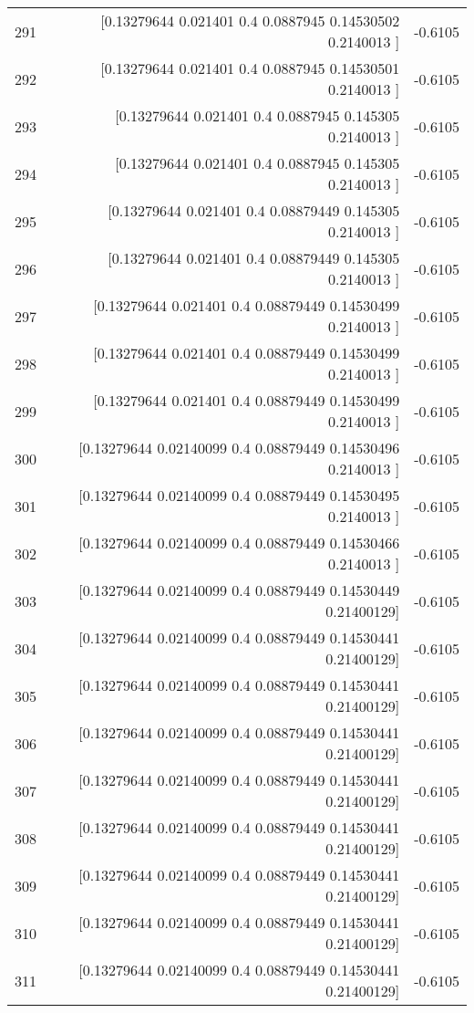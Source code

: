 \begin{longtable}{lrr}
291 & [0.13279644 0.021401   0.4        0.0887945  0.14530502 0.2140013 ] & -0.6105 \\
292 & [0.13279644 0.021401   0.4        0.0887945  0.14530501 0.2140013 ] & -0.6105 \\
293 & [0.13279644 0.021401   0.4        0.0887945  0.145305   0.2140013 ] & -0.6105 \\
294 & [0.13279644 0.021401   0.4        0.0887945  0.145305   0.2140013 ] & -0.6105 \\
295 & [0.13279644 0.021401   0.4        0.08879449 0.145305   0.2140013 ] & -0.6105 \\
296 & [0.13279644 0.021401   0.4        0.08879449 0.145305   0.2140013 ] & -0.6105 \\
297 & [0.13279644 0.021401   0.4        0.08879449 0.14530499 0.2140013 ] & -0.6105 \\
298 & [0.13279644 0.021401   0.4        0.08879449 0.14530499 0.2140013 ] & -0.6105 \\
299 & [0.13279644 0.021401   0.4        0.08879449 0.14530499 0.2140013 ] & -0.6105 \\
300 & [0.13279644 0.02140099 0.4        0.08879449 0.14530496 0.2140013 ] & -0.6105 \\
301 & [0.13279644 0.02140099 0.4        0.08879449 0.14530495 0.2140013 ] & -0.6105 \\
302 & [0.13279644 0.02140099 0.4        0.08879449 0.14530466 0.2140013 ] & -0.6105 \\
303 & [0.13279644 0.02140099 0.4        0.08879449 0.14530449 0.21400129] & -0.6105 \\
304 & [0.13279644 0.02140099 0.4        0.08879449 0.14530441 0.21400129] & -0.6105 \\
305 & [0.13279644 0.02140099 0.4        0.08879449 0.14530441 0.21400129] & -0.6105 \\
306 & [0.13279644 0.02140099 0.4        0.08879449 0.14530441 0.21400129] & -0.6105 \\
307 & [0.13279644 0.02140099 0.4        0.08879449 0.14530441 0.21400129] & -0.6105 \\
308 & [0.13279644 0.02140099 0.4        0.08879449 0.14530441 0.21400129] & -0.6105 \\
309 & [0.13279644 0.02140099 0.4        0.08879449 0.14530441 0.21400129] & -0.6105 \\
310 & [0.13279644 0.02140099 0.4        0.08879449 0.14530441 0.21400129] & -0.6105 \\
311 & [0.13279644 0.02140099 0.4        0.08879449 0.14530441 0.21400129] & -0.6105 \\

\end{longtable}
